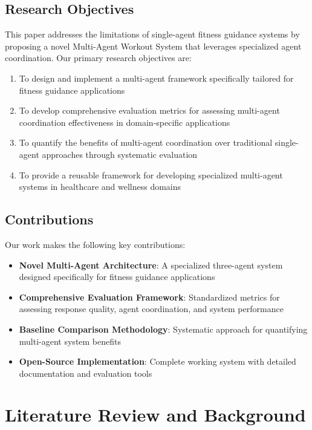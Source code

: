 \documentclass[conference]{IEEEtran}
\begin{document}
\subsection{Research Objectives}

This paper addresses the limitations of single-agent fitness guidance systems by proposing a novel Multi-Agent Workout System that leverages specialized agent coordination. Our primary research objectives are:

\begin{enumerate}
\item To design and implement a multi-agent framework specifically tailored for fitness guidance applications
\item To develop comprehensive evaluation metrics for assessing multi-agent coordination effectiveness in domain-specific applications
\item To quantify the benefits of multi-agent coordination over traditional single-agent approaches through systematic evaluation
\item To provide a reusable framework for developing specialized multi-agent systems in healthcare and wellness domains
\end{enumerate}

\subsection{Contributions}

Our work makes the following key contributions:

\begin{itemize}
\item \textbf{Novel Multi-Agent Architecture}: A specialized three-agent system designed specifically for fitness guidance applications
\item \textbf{Comprehensive Evaluation Framework}: Standardized metrics for assessing response quality, agent coordination, and system performance
\item \textbf{Baseline Comparison Methodology}: Systematic approach for quantifying multi-agent system benefits
\item \textbf{Open-Source Implementation}: Complete working system with detailed documentation and evaluation tools
\end{itemize}

\section{Literature Review and Background}
\end{document}
